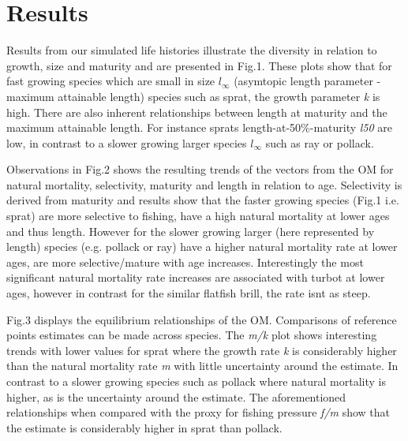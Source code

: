 \documentclass[preprint,12pt]{elsarticle}
\begin{document}
  
\section{Results}

Results from our simulated life histories illustrate the diversity in relation to growth, size and maturity and are presented in Fig.1. These plots show that for fast growing species which are small in size $l_{\infty}$ (asymtopic length parameter - maximum attainable length) species such as sprat, the growth parameter \textit{k} is high. There are also inherent relationships between length at maturity and the maximum attainable length. For instance sprats length-at-50\%-maturity \textit{l50} are low, in contrast to a slower growing larger species $l_{\infty}$ such as ray or pollack.

Observations in Fig.2 shows the resulting trends of the vectors from the OM for natural mortality, selectivity, maturity and length in relation to age. Selectivity is derived from maturity and results show that the faster growing species (Fig.1 i.e. sprat) are more selective to fishing, have a high natural mortality at lower ages and thus length.  However for the slower growing larger (here represented by length) species (e.g. pollack or ray) have a higher natural mortality rate at lower ages, are more selective/mature with age increases. Interestingly the most significant natural mortality rate increases are associated with turbot at lower ages, however in contrast for the similar flatfish brill, the rate isnt as steep. 

Fig.3 displays the equilibrium relationships of the OM. Comparisons of reference points estimates can be made across species.  The \textit{m/k} plot shows interesting trends with lower values for sprat where the growth rate \textit{k} is considerably higher than the natural mortality rate \textit{m} with little uncertainty around the estimate. In contrast to a slower growing species such as pollack where natural mortality is higher, as is the uncertainty around the estimate. The aforementioned relationships when compared with the proxy for fishing pressure \textit{f/m} show that the estimate is considerably higher in sprat than pollack. 
\end{document}
